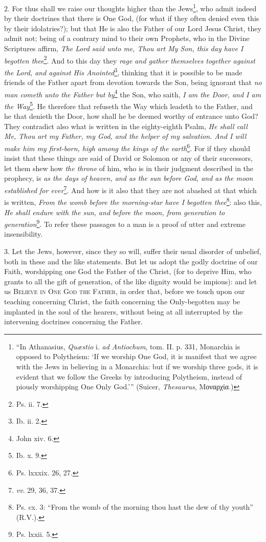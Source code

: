 2. For thus shall we raise our thoughts higher than the Jews\footnote{“In Athanasius, \emph{Quæstio} i. \emph{ad Antiochum}, tom. II. p. 331, Monarchia is opposed to Polytheism: ‘If we worship One God, it is manifest that we agree with the Jews in believing in a Monarchia: but if we worship three gods, it is evident that we follow the Greeks by introducing Polytheism, instead of piously worshipping One Only God.’” (Suicer, \emph{Thesaurus}, \textgreek{Μοναρχία}.)}, who admit indeed by their doctrines that there is One God, (for what if they often denied even this by their idolatries?); but that He is also the Father of our Lord Jesus Christ, they admit not; being of a contrary mind to their own Prophets, who in the Divine Scriptures affirm, \emph{The Lord said unto me, Thou art My Son, this day have I begotten thee}\footnote{Ps. ii. 7.}. And to this day they \emph{rage and gather themselves together against the Lord, and against His Anointed}\footnote{Ib. ii. 2.}, thinking that it is possible to be made friends of the Father apart from devotion towards the Son, being ignorant that \emph{no man cometh unto the Father but by}\footnote{John xiv. 6.} the Son, who saith, \emph{I am the Door, and I am the Way}\footnote{Ib. x. 9.}. He therefore that refuseth the Way which leadeth to the Father, and he that denieth the Door, how shall he be deemed worthy of entrance unto God? They contradict also what is written in the eighty-eighth Psalm, \emph{He shall call Me, Thou art my Father, my God, and the helper of my salvation. And I will make him my first-born, high among the kings of the earth}\footnote{Ps. lxxxix. 26, 27.}. For if they should insist that these things are said of David or Solomon or any of their successors, let them shew how \emph{the throne} of him, who is in their judgment described in the prophecy, is \emph{as the days of heaven, and as the sun before God, and as the moon established for ever}\footnote{\emph{vv}. 29, 36, 37.}. And how is it also that they are not abashed at that which is written, \emph{From the womb before the morning-star have I begotten thee}\footnote{Ps. cx. 3: “From the womb of the morning thou hast the dew of thy youth” (R.V.).}: also this, \emph{He shall endure with the sun, and before the moon, from generation to generation}\footnote{Ps. lxxii. 5.}. To refer these passages to a man is a proof of utter and extreme insensibility.

3. Let the Jews, however, since they so will, suffer their usual disorder of unbelief, both in these and the like statements. But let us adopt the godly doctrine of our Faith, worshipping one God the Father of the Christ, (for to deprive Him, who grants to all the gift of generation, of the like dignity would be impious): and let us \textsc{Believe in One God the Father}, in order that, before we touch upon our teaching concerning Christ, the faith concerning the Only-begotten may be implanted in the soul of the hearers, without being at all interrupted by the intervening doctrines concerning the Father.

